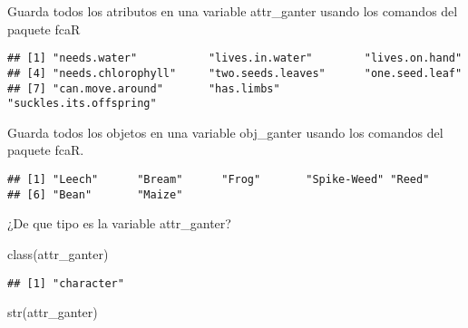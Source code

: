 \documentclass[
]{book}
\newenvironment{Shaded}{\begin{snugshade}}{\end{snugshade}}
\newcommand{\FunctionTok}[1]{\textcolor[rgb]{0.00,0.00,0.00}{#1}}
\newcommand{\NormalTok}[1]{#1}
\newcommand{\OtherTok}[1]{\textcolor[rgb]{0.56,0.35,0.01}{#1}}
\newcommand{\SpecialCharTok}[1]{\textcolor[rgb]{0.00,0.00,0.00}{#1}}
\begin{document}
Guarda todos los atributos en una variable attr\_ganter usando los comandos del paquete fcaR

\begin{Shaded}
\end{Shaded}

\begin{verbatim}
## [1] "needs.water"           "lives.in.water"        "lives.on.hand"        
## [4] "needs.chlorophyll"     "two.seeds.leaves"      "one.seed.leaf"        
## [7] "can.move.around"       "has.limbs"             "suckles.its.offspring"
\end{verbatim}

Guarda todos los objetos en una variable obj\_ganter usando los comandos del paquete fcaR.

\begin{Shaded}
\end{Shaded}

\begin{verbatim}
## [1] "Leech"      "Bream"      "Frog"       "Spike-Weed" "Reed"      
## [6] "Bean"       "Maize"
\end{verbatim}

¿De que tipo es la variable attr\_ganter?

\begin{Shaded}
\begin{Highlighting}[]
\FunctionTok{class}\NormalTok{(attr\_ganter)}
\end{Highlighting}
\end{Shaded}

\begin{verbatim}
## [1] "character"
\end{verbatim}

\begin{Shaded}
\begin{Highlighting}[]
\FunctionTok{str}\NormalTok{(attr\_ganter)}
\end{Highlighting}
\end{Shaded}
\end{document}
